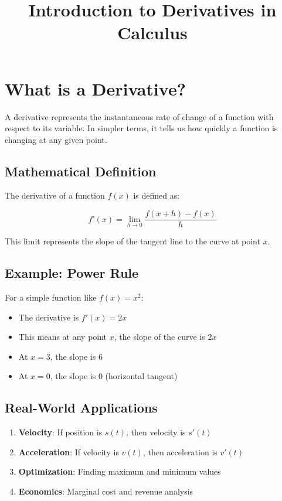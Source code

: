 \documentclass{article}
\title{Introduction to Derivatives in Calculus}
\author{}
\date{}
\begin{document}
\maketitle

\section{What is a Derivative?}

A derivative represents the instantaneous rate of change of a function with respect to its variable. In simpler terms, it tells us how quickly a function is changing at any given point.

\subsection{Mathematical Definition}

The derivative of a function $f(x)$ is defined as:

\begin{equation}
f'(x) = \lim_{h \to 0} \frac{f(x+h) - f(x)}{h}
\end{equation}

This limit represents the slope of the tangent line to the curve at point $x$.

\subsection{Example: Power Rule}

For a simple function like $f(x) = x^2$:
\begin{itemize}
    \item The derivative is $f'(x) = 2x$
    \item This means at any point $x$, the slope of the curve is $2x$
    \item At $x = 3$, the slope is $6$
    \item At $x = 0$, the slope is $0$ (horizontal tangent)
\end{itemize}

\subsection{Real-World Applications}

\begin{enumerate}
    \item \textbf{Velocity}: If position is $s(t)$, then velocity is $s'(t)$
    \item \textbf{Acceleration}: If velocity is $v(t)$, then acceleration is $v'(t)$
    \item \textbf{Optimization}: Finding maximum and minimum values
    \item \textbf{Economics}: Marginal cost and revenue analysis
\end{enumerate}
\end{document}
